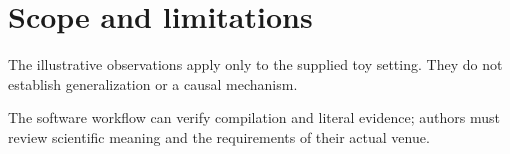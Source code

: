\section{Scope and limitations}\label{sec:discussion}
The illustrative observations apply only to the supplied toy setting.
They do not establish generalization or a causal mechanism.
\par{}
The software workflow can verify compilation and literal evidence; authors
must review scientific meaning and the requirements of their actual venue.
